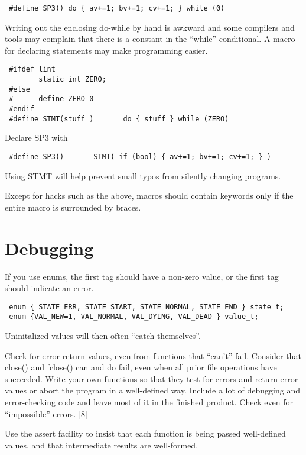 \begin{verbatim}
 #define SP3() do { av+=1; bv+=1; cv+=1; } while (0)
\end{verbatim}

Writing out the enclosing do-while by hand is awkward and some compilers and
tools may complain that there is a constant in the ``while'' conditional. A
macro for declaring statements may make programming easier. 

\begin{verbatim}
 #ifdef lint
        static int ZERO;
 #else
 #      define ZERO 0
 #endif
 #define STMT(stuff )       do { stuff } while (ZERO) 
\end{verbatim}

Declare SP3 with 

\begin{verbatim}
 #define SP3()       STMT( if (bool) { av+=1; bv+=1; cv+=1; } )
\end{verbatim}

Using STMT will help prevent small typos from silently changing programs. 

Except for hacks such as the above, macros should contain keywords
only if the entire macro is surrounded by braces. 

\section{Debugging}

 If you use enums, the first tag should have a non-zero value, or the first tag
should indicate an error. 
\begin{verbatim}
 enum { STATE_ERR, STATE_START, STATE_NORMAL, STATE_END } state_t;
 enum {VAL_NEW=1, VAL_NORMAL, VAL_DYING, VAL_DEAD } value_t; 
\end{verbatim}
Uninitalized values will then often ``catch themselves''. 

 Check for error return values, even from functions that ``can't'' fail.
Consider that close() and fclose() can and do fail, even when all prior file
operations have succeeded. Write your own functions so that they test for
errors and return error values or abort the program in a well-defined way.
Include a lot of debugging and error-checking code and leave most of it in 
the finished product. Check even for ``impossible'' errors. [8] 

 Use the assert facility to insist that each function is being passed
well-defined values, and that intermediate results are well-formed. 

